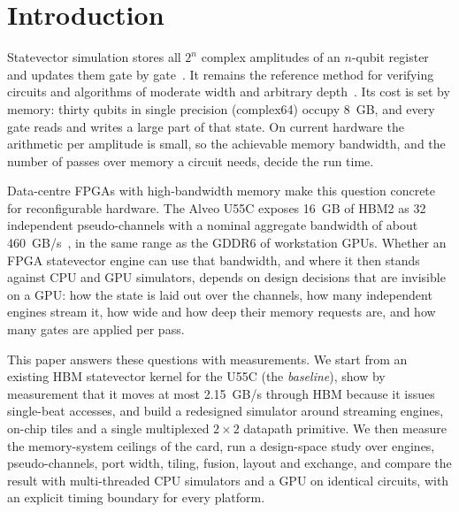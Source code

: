 \documentclass[pdflatex,sn-mathphys-num]{sn-jnl}
\newcommand{\NumVsevenBwMax}{2.15}
\theoremstyle{thmstyleone}
\theoremstyle{thmstylethree}
\begin{document}

\maketitle

\section{Introduction}\label{sec:introduction}

Statevector simulation stores all $2^n$ complex amplitudes of an $n$-qubit register and updates them gate by gate~\cite{nielsen2010quantum}. It remains the reference method for verifying circuits and algorithms of moderate width and arbitrary depth~\cite{preskill2018quantum,arute2019quantum}. Its cost is set by memory: thirty qubits in single precision (complex64) occupy 8~GB, and every gate reads and writes a large part of that state. On current hardware the arithmetic per amplitude is small, so the achievable memory bandwidth, and the number of passes over memory a circuit needs, decide the run time.

Data-centre FPGAs with high-bandwidth memory make this question concrete for reconfigurable hardware. The Alveo U55C exposes 16~GB of HBM2 as 32 independent pseudo-channels with a nominal aggregate bandwidth of about 460~GB/s~\cite{xilinx2023alveo}, in the same range as the GDDR6 of workstation GPUs. Whether an FPGA statevector engine can use that bandwidth, and where it then stands against CPU and GPU simulators, depends on design decisions that are invisible on a GPU: how the state is laid out over the channels, how many independent engines stream it, how wide and how deep their memory requests are, and how many gates are applied per pass.

This paper answers these questions with measurements. We start from an existing HBM statevector kernel for the U55C (the \emph{baseline}), show by measurement that it moves at most \NumVsevenBwMax~GB/s through HBM because it issues single-beat accesses, and build a redesigned simulator around streaming engines, on-chip tiles and a single multiplexed $2\times 2$ datapath primitive. We then measure the memory-system ceilings of the card, run a design-space study over engines, pseudo-channels, port width, tiling, fusion, layout and exchange, and compare the result with multi-threaded CPU simulators and a GPU on identical circuits, with an explicit timing boundary for every platform.
\end{document}
